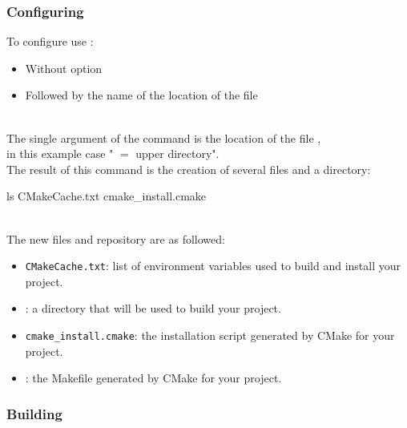 \subsubsection*{Configuring}

To configure use :
\begin{itemize}
\item Without option
\item Followed by the name of the location of the file 
\end{itemize}
\vspace{-1cm}
\begin{script}
  
\end{script}
\\[-0.5cm]
\noindent The single argument of the command is the location of the file , \\
in this example case " $=$ upper directory". \\
The result of this command is the creation of several files and a directory:
\begin{script}
 ls
CMakeCache.txt    cmake\_install.cmake  
\end{script}
\\[-0.5cm]
\noindent The new files and repository are as followed:
\begin{itemize}
\item \texttt{CMakeCache.txt}: list of environment variables used to build and install your project. 
\item {}: a directory that will be used to build your project. 
\item \texttt{cmake\_install.cmake}: the installation script generated by CMake for your project.
\item {}: the Makefile generated by CMake for your project.
\end{itemize}

\subsubsection*{Building}

